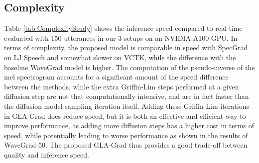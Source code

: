 \begin{table}[t]
\centering
     \caption{Results when training on 19 speakers of VCTK and evaluating on 90 other speakers of VCTK}
    \label{tab:Experiment3}
\end{table}

\subsection{Complexity}

Table \ref{tab:ComplexityStudy} shows the inference speed compared to real-time evaluated with 150 utterances in our 3 setups on an NVIDIA A100 GPU. In terms of complexity, the proposed model is comparable in speed with SpecGrad on LJ Speech and somewhat slower on VCTK, while the difference with the baseline WaveGrad model is higher. The computation of the pseudo-inverse of the mel spectrogram accounts for a significant amount of the speed difference between the methods, while the extra Griffin-Lim steps performed at a given diffusion step are not that computationally intensive, and are in fact faster than the diffusion model sampling iteration itself. Adding these Griffin-Lim iterations in GLA-Grad does reduce speed, but it is both an effective and efficient way to improve performance, as adding more diffusion steps has a higher cost in terms of speed, while potentially leading to worse performance as shown in the results of WaveGrad-50.
The proposed GLA-Grad thus provides a good trade-off between quality and inference speed.


